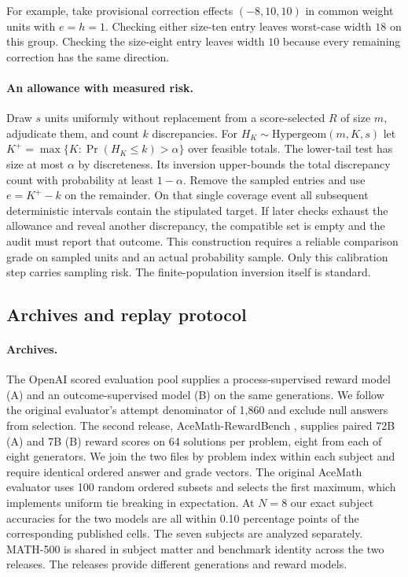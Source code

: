 \documentclass[10pt,letterpaper]{article}
\begin{document}
For example, take provisional correction effects $(-8,10,10)$ in common weight units with $e=h=1$. Checking either size-ten entry leaves worst-case width $18$ on this group. Checking the size-eight entry leaves width $10$ because every remaining correction has the same direction.

\paragraph{An allowance with measured risk.}
Draw $s$ units uniformly without replacement from a score-selected $R$ of size $m$, adjudicate them, and count $k$ discrepancies. For $H_K\sim\mathrm{Hypergeom}(m,K,s)$ let $K^+=\max\{K:\Pr(H_K\leq k)>\alpha\}$ over feasible totals. The lower-tail test has size at most $\alpha$ by discreteness. Its inversion upper-bounds the total discrepancy count with probability at least $1-\alpha$. Remove the sampled entries and use $e=K^+-k$ on the remainder. On that single coverage event all subsequent deterministic intervals contain the stipulated target. If later checks exhaust the allowance and reveal another discrepancy, the compatible set is empty and the audit must report that outcome. This construction requires a reliable comparison grade on sampled units and an actual probability sample. Only this calibration step carries sampling risk. The finite-population inversion itself is standard.

\subsection*{Archives and replay protocol}
\paragraph{Archives.}
The OpenAI scored evaluation pool \cite{lightman} supplies a process-supervised reward model (A) and an outcome-supervised model (B) on the same generations. We follow the original evaluator's attempt denominator of 1,860 and exclude null answers from selection. The second release, AceMath-RewardBench \cite{ace}, supplies paired 72B (A) and 7B (B) reward scores on 64 solutions per problem, eight from each of eight generators. We join the two files by problem index within each subject and require identical ordered answer and grade vectors. The original AceMath evaluator uses 100 random ordered subsets and selects the first maximum, which implements uniform tie breaking in expectation. At $N=8$ our exact subject accuracies for the two models are all within 0.10 percentage points of the corresponding published cells. The seven subjects are analyzed separately. MATH-500 is shared in subject matter and benchmark identity across the two releases. The releases provide different generations and reward models.
\end{document}
